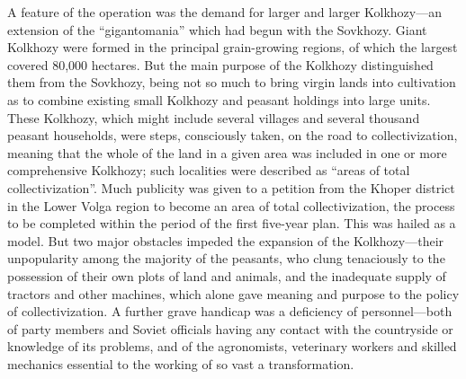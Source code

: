 A feature of the operation was the demand for larger and larger Kolkhozy---an extension of the ``gigantomania'' which had begun with the Sovkhozy. Giant Kolkhozy were formed in the principal grain-growing regions, of which the largest covered 80,000 hectares. But the main purpose of the Kolkhozy distinguished them from the Sovkhozy, being not so much to bring virgin lands into cultivation as to combine existing small Kolkhozy and peasant holdings into large units. These Kolkhozy, which might include several villages and several thousand peasant households, were steps, consciously taken, on the road to collectivization, meaning that the whole of the land in a given area was included in one or more comprehensive Kolkhozy; such localities were described as ``areas of total collectivization''. Much publicity was given to a petition from the Khoper district in the Lower Volga region to become an area of total collectivization, the process to be completed within the period of the first five-year plan. This was hailed as a model. But two major obstacles impeded the expansion of the Kolkhozy---their unpopularity among the majority of the peasants, who clung tenaciously to the possession of their own plots of land and animals, and the inadequate supply of tractors and other machines, which alone gave meaning and purpose to the policy of collectivization. A further grave handicap was a deficiency of personnel---both of party members and Soviet officials having any contact with the countryside or knowledge of its problems, and of the agronomists, veterinary workers and skilled mechanics essential to the working of so vast a transformation. 


